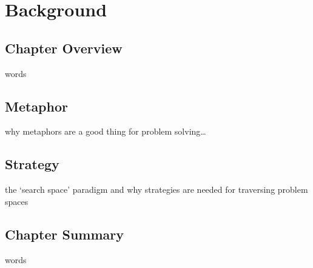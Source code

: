 %
%


%
%
\chapter{Background}
\label{ch:background}

%
%
\section{Chapter Overview}
\label{ch:insights:overview}
words




%
%
\section{Metaphor}
why metaphors are a good thing for problem solving\ldots


%
%
\section{Strategy}
the `search space' paradigm and why strategies are needed for traversing
problem spaces






%
%
\section{Chapter Summary}
\label{ch:insights:summary}
words






